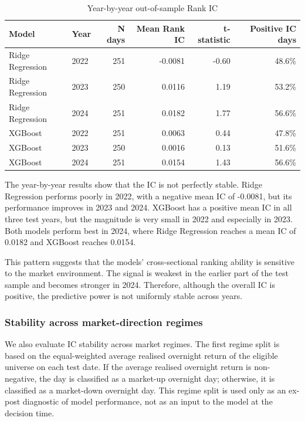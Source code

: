 \documentclass[12pt]{article}
\begin{document}
\begin{table}[htbp]
\centering
\small
\caption{Year-by-year out-of-sample Rank IC}
\label{tab:yearly_ic}
\begin{tabular}{llrrrr}
\toprule
Model & Year & N days & Mean Rank IC & t-statistic & Positive IC days \\
\midrule
Ridge Regression & 2022 & 251 & -0.0081 & -0.60 & 48.6\% \\
Ridge Regression & 2023 & 250 & 0.0116 & 1.19 & 53.2\% \\
Ridge Regression & 2024 & 251 & 0.0182 & 1.77 & 56.6\% \\
\midrule
XGBoost & 2022 & 251 & 0.0063 & 0.44 & 47.8\% \\
XGBoost & 2023 & 250 & 0.0016 & 0.13 & 51.6\% \\
XGBoost & 2024 & 251 & 0.0154 & 1.43 & 56.6\% \\
\bottomrule
\end{tabular}
\end{table}

The year-by-year results show that the IC is not perfectly stable. Ridge Regression performs poorly in 2022, with a negative mean IC of -0.0081, but its performance improves in 2023 and 2024. XGBoost has a positive mean IC in all three test years, but the magnitude is very small in 2022 and especially in 2023. Both models perform best in 2024, where Ridge Regression reaches a mean IC of 0.0182 and XGBoost reaches 0.0154.

This pattern suggests that the models' cross-sectional ranking ability is sensitive to the market environment. The signal is weakest in the earlier part of the test sample and becomes stronger in 2024. Therefore, although the overall IC is positive, the predictive power is not uniformly stable across years.

\subsubsection{Stability across market-direction regimes}

We also evaluate IC stability across market regimes. The first regime split is based on the equal-weighted average realised overnight return of the eligible universe on each test date. If the average realised overnight return is non-negative, the day is classified as a market-up overnight day; otherwise, it is classified as a market-down overnight day. This regime split is used only as an ex-post diagnostic of model performance, not as an input to the model at the decision time.
\end{document}
